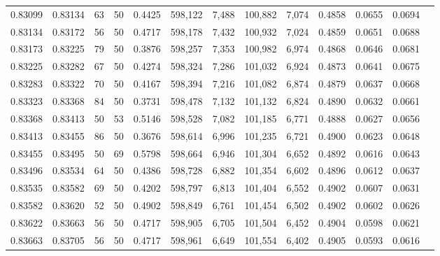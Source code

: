\begin{tabular}{rrrrrrrrrrrrr}
0.83099 & 0.83134 &    63 &  50 &                                     0.4425 & 598,122 &   7,488 & 100,882 &   7,074 & 0.4858 & 0.0655 & 0.0694 \\
0.83134 & 0.83172 &    56 &  50 &                                     0.4717 & 598,178 &   7,432 & 100,932 &   7,024 & 0.4859 & 0.0651 & 0.0688 \\
0.83173 & 0.83225 &    79 &  50 &                                     0.3876 & 598,257 &   7,353 & 100,982 &   6,974 & 0.4868 & 0.0646 & 0.0681 \\
0.83225 & 0.83282 &    67 &  50 &                                     0.4274 & 598,324 &   7,286 & 101,032 &   6,924 & 0.4873 & 0.0641 & 0.0675 \\
0.83283 & 0.83322 &    70 &  50 &                                     0.4167 & 598,394 &   7,216 & 101,082 &   6,874 & 0.4879 & 0.0637 & 0.0668 \\
0.83323 & 0.83368 &    84 &  50 &                                     0.3731 & 598,478 &   7,132 & 101,132 &   6,824 & 0.4890 & 0.0632 & 0.0661 \\
0.83368 & 0.83413 &    50 &  53 &                                     0.5146 & 598,528 &   7,082 & 101,185 &   6,771 & 0.4888 & 0.0627 & 0.0656 \\
0.83413 & 0.83455 &    86 &  50 &                                     0.3676 & 598,614 &   6,996 & 101,235 &   6,721 & 0.4900 & 0.0623 & 0.0648 \\
0.83455 & 0.83495 &    50 &  69 &                                     0.5798 & 598,664 &   6,946 & 101,304 &   6,652 & 0.4892 & 0.0616 & 0.0643 \\
0.83496 & 0.83534 &    64 &  50 &                                     0.4386 & 598,728 &   6,882 & 101,354 &   6,602 & 0.4896 & 0.0612 & 0.0637 \\
0.83535 & 0.83582 &    69 &  50 &                                     0.4202 & 598,797 &   6,813 & 101,404 &   6,552 & 0.4902 & 0.0607 & 0.0631 \\
0.83582 & 0.83620 &    52 &  50 &                                     0.4902 & 598,849 &   6,761 & 101,454 &   6,502 & 0.4902 & 0.0602 & 0.0626 \\
0.83622 & 0.83663 &    56 &  50 &                                     0.4717 & 598,905 &   6,705 & 101,504 &   6,452 & 0.4904 & 0.0598 & 0.0621 \\
0.83663 & 0.83705 &    56 &  50 &                                     0.4717 & 598,961 &   6,649 & 101,554 &   6,402 & 0.4905 & 0.0593 & 0.0616 \\

\end{tabular}
